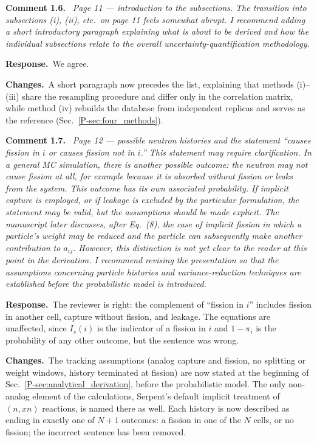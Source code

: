 \documentclass[11pt]{article}
\newenvironment{revcomment}[1]
  {\par\medskip\noindent\textbf{Comment #1.}\ \itshape}
  {\par}
\newcommand{\response}{\par\noindent\textbf{Response.}\ }
\newcommand{\changes}{\par\noindent\textbf{Changes.}\ }
\begin{document}
\begin{revcomment}{1.6}
Page 11 --- introduction to the subsections. The transition into subsections (i), (ii),
etc.\ on page 11 feels somewhat abrupt. I recommend adding a short introductory paragraph
explaining what is about to be derived and how the individual subsections relate to the
overall uncertainty-quantification methodology.
\end{revcomment}
\response We agree.
\changes A short paragraph now precedes the list, explaining that methods (i)--(iii) share the resampling procedure and differ only in the correlation matrix, while method (iv) rebuilds the database from independent replicas and serves as the reference (Sec.~\ref{P-sec:four_methods}).

\begin{revcomment}{1.7}
Page 12 --- possible neutron histories and the statement ``causes fission in $i$ or
causes fission not in $i$.'' This statement may require clarification. In a general MC
simulation, there is another possible outcome: the neutron may not cause fission at all,
for example because it is absorbed without fission or leaks from the system. This outcome
has its own associated probability. If implicit capture is employed, or if leakage is
excluded by the particular formulation, the statement may be valid, but the assumptions
should be made explicit. The manuscript later discusses, after Eq.~(8), the case of
implicit fission in which a particle's weight may be reduced and the particle can
subsequently make another contribution to $a_{ij}$. However, this distinction is not yet
clear to the reader at this point in the derivation. I recommend revising the
presentation so that the assumptions concerning particle histories and variance-reduction
techniques are established before the probabilistic model is introduced.
\end{revcomment}
\response The reviewer is right: the complement of ``fission in $i$'' includes fission in another cell, capture without fission, and leakage. The equations are unaffected, since $I_s(i)$ is the indicator of a fission in $i$ and $1-\pi_i$ is the probability of any other outcome, but the sentence was wrong.
\changes The tracking assumptions (analog capture and fission, no splitting or weight windows, history terminated at fission) are now stated at the beginning of Sec.~\ref{P-sec:analytical_derivation}, before the probabilistic model. The only non-analog element of the calculations, Serpent's default implicit treatment of $(n,xn)$ reactions, is named there as well. Each history is now described as ending in exactly one of $N+1$ outcomes: a fission in one of the $N$ cells, or no fission; the incorrect sentence has been removed.
\end{document}
